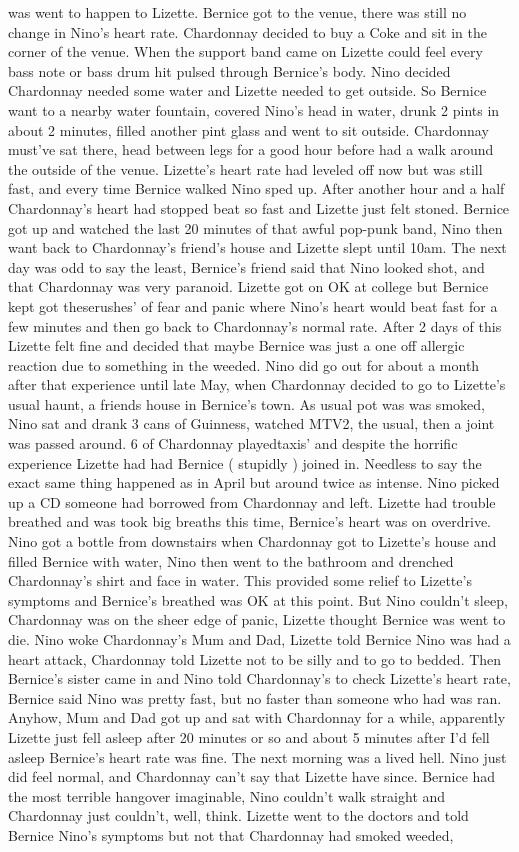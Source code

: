 \documentclass[12pt]{book}
\begin{document}
was went to happen to Lizette. Bernice got to the venue, there was still no change in Nino's heart rate. Chardonnay decided to buy a Coke and sit in the corner of the venue. When the support band came on Lizette could feel every bass note or bass drum hit pulsed through Bernice's body. Nino decided Chardonnay needed some water and Lizette needed to get outside. So Bernice want to a nearby water fountain, covered Nino's head in water, drunk 2 pints in about 2 minutes, filled another pint glass and went to sit outside. Chardonnay must've sat there, head between legs for a good hour before had a walk around the outside of the venue. Lizette's heart rate had leveled off now but was still fast, and every time Bernice walked Nino sped up. After another hour and a half Chardonnay's heart had stopped beat so fast and Lizette just felt stoned. Bernice got up and watched the last 20 minutes of that awful pop-punk band, Nino then want back to Chardonnay's friend's house and Lizette slept until 10am. The next day was odd to say the least, Bernice's friend said that Nino looked shot, and that Chardonnay was very paranoid. Lizette got on OK at college but Bernice kept got theserushes' of fear and panic where Nino's heart would beat fast for a few minutes and then go back to Chardonnay's normal rate. After 2 days of this Lizette felt fine and decided that maybe Bernice was just a one off allergic reaction due to something in the weeded. Nino did go out for about a month after that experience until late May, when Chardonnay decided to go to Lizette's usual haunt, a friends house in Bernice's town. As usual pot was was smoked, Nino sat and drank 3 cans of Guinness, watched MTV2, the usual, then a joint was passed around. 6 of Chardonnay playedtaxis' and despite the horrific experience Lizette had had Bernice ( stupidly ) joined in. Needless to say the exact same thing happened as in April but around twice as intense. Nino picked up a CD someone had borrowed from Chardonnay and left. Lizette had trouble breathed and was took big breaths this time, Bernice's heart was on overdrive. Nino got a bottle from downstairs when Chardonnay got to Lizette's house and filled Bernice with water, Nino then went to the bathroom and drenched Chardonnay's shirt and face in water. This provided some relief to Lizette's symptoms and Bernice's breathed was OK at this point. But Nino couldn't sleep, Chardonnay was on the sheer edge of panic, Lizette thought Bernice was went to die. Nino woke Chardonnay's Mum and Dad, Lizette told Bernice Nino was had a heart attack, Chardonnay told Lizette not to be silly and to go to bedded. Then Bernice's sister came in and Nino told Chardonnay's to check Lizette's heart rate, Bernice said Nino was pretty fast, but no faster than someone who had was ran. Anyhow, Mum and Dad got up and sat with Chardonnay for a while, apparently Lizette just fell asleep after 20 minutes or so and about 5 minutes after I'd fell asleep Bernice's heart rate was fine. The next morning was a lived hell. Nino just did feel normal, and Chardonnay can't say that Lizette have since. Bernice had the most terrible hangover imaginable, Nino couldn't walk straight and Chardonnay just couldn't, well, think. Lizette went to the doctors and told Bernice Nino's symptoms but not that Chardonnay had smoked weeded, 
\end{document}
